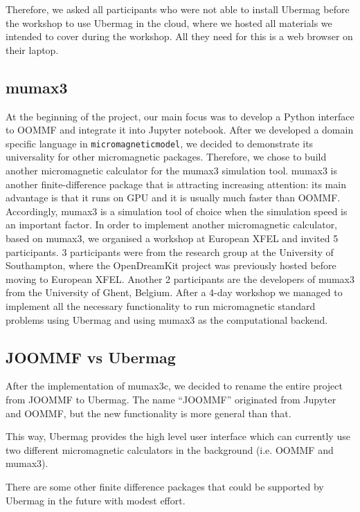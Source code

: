 \documentclass{deliverablereport}
\begin{document}
Therefore, we asked all participants who were not able to
install Ubermag before the workshop to use Ubermag in the cloud, where
we hosted all materials we intended to cover during the workshop. All
they need for this is a web browser on their laptop.

\subsection{mumax3}

At the beginning of the project, our main focus was to develop a
Python interface to OOMMF and integrate it into Jupyter
notebook. After we developed a domain specific language in
\texttt{micromagneticmodel}, we decided to demonstrate its
universality for other micromagnetic packages. Therefore, we chose to
build another micromagnetic calculator for the mumax3 simulation
tool. mumax3 is another finite-difference package that is attracting
increasing attention: its main advantage is that it runs on GPU and it
is usually much faster than OOMMF. Accordingly, mumax3 is a simulation
tool of choice when the simulation speed is an important factor. In
order to implement another micromagnetic calculator, based on mumax3,
we organised a workshop at European XFEL and invited 5 participants. 3
participants were from the research group at the University of
Southampton, where the OpenDreamKit project was previously hosted
before moving to European XFEL. Another 2 participants are the
developers of mumax3 from the University of Ghent, Belgium. After a
4-day workshop we managed to implement all the necessary functionality
to run micromagnetic standard problems using Ubermag and using mumax3
as the computational backend.

\subsection{JOOMMF vs Ubermag}

After the implementation of mumax3c, we decided to rename the entire
project from JOOMMF to Ubermag. The name ``JOOMMF'' originated from
Jupyter and OOMMF, but the new functionality is more general than
that.

This way, Ubermag provides the high level user interface which can
currently use two different micromagnetic calculators in the
background (i.e. OOMMF and mumax3).

There are some other finite difference packages that could be supported by
Ubermag in the future with modest effort.
\end{document}
